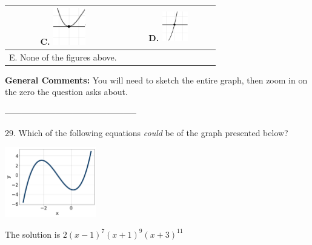 \documentclass{article}[14pt]
\begin{document}
\begin{tabular}{|c|c|}
 \textbf{C.} \includegraphics[width=0.3\textwidth]{../Figures/zeroBehaviorPositiveEvenB.png} & \textbf{D.} \includegraphics[width=0.3\textwidth]{../Figures/zeroBehaviorPositiveOddB.png} \tabularnewline 
\hline 
 E. None of the figures above. & \tabularnewline 
\hline 
 \end{tabular} 
 
\textbf{General Comments:} You will need to sketch the entire graph, then zoom in on the zero the question asks about.

-----------------------------------------------

29. Which of the following equations \textit{could} be of the graph presented below?
\begin{center} \includegraphics[width=0.3\textwidth]{../Figures/polyGraphToFunctionB.png} \end{center} 

The solution is $ 2(x - 1)^{7} (x + 1)^{9} (x + 3)^{11} $ 
\end{document}

